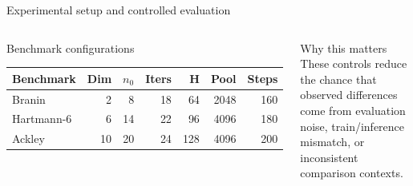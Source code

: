 \documentclass[aspectratio=169]{beamer}
\begin{document}
\begin{frame}{Experimental setup and controlled evaluation}
\begin{columns}[T,onlytextwidth]
\begin{minipage}[t][0.80\textheight]{\linewidth}
  \vfill

  \begin{cardG}{Benchmark configurations}
  \centering
  \scriptsize
  \begin{tabular}{lrrrrrr}
  \toprule
  Benchmark & Dim & $n_0$ & Iters & H & Pool & Steps \\
  \midrule
  Branin & 2 & 8 & 18 & 64 & 2048 & 160 \\
  Hartmann-6 & 6 & 14 & 22 & 96 & 4096 & 180 \\
  Ackley & 10 & 20 & 24 & 128 & 4096 & 200 \\
  \bottomrule
  \end{tabular}
  \end{cardG}

  \vfill

  \begin{card}{Why this matters}
  These controls reduce the chance that observed differences come from evaluation noise, train/inference mismatch, or inconsistent comparison contexts.
  \end{card}
\end{minipage}
\end{columns}
\end{frame}
\end{document}
